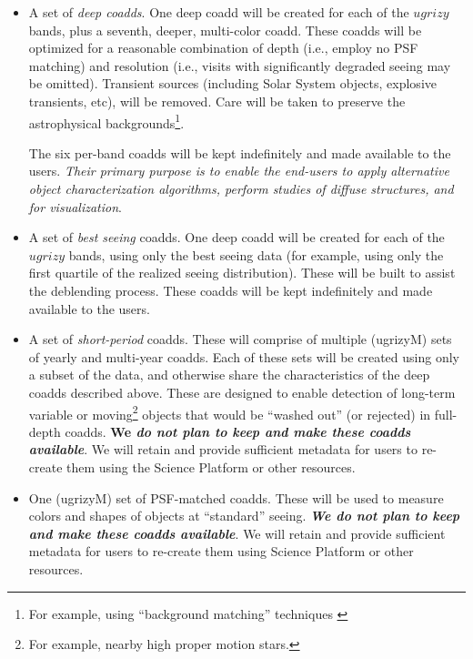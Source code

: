 \documentclass[SE,lsstdraft,toc]{lsstdoc}
\begin{document}
\begin{itemize}
    \item A set of \emph{deep coadds}. One deep coadd will be created for each of the $ugrizy$ bands, plus a seventh, deeper, multi-color coadd. These coadds will be optimized for a reasonable combination of depth (i.e., employ no PSF matching) and resolution (i.e., visits with significantly degraded seeing may be omitted). Transient sources (including Solar System objects, explosive transients, etc), will be removed. Care will be taken to preserve the astrophysical backgrounds\footnote{For example, using ``background matching'' techniques \citep{DMTN-035}}.

    The six per-band coadds will be kept indefinitely and made available to the users. \emph{Their primary purpose is to enable the end-users to apply alternative object characterization algorithms, perform studies of diffuse structures, and for visualization}.

    \item A set of \emph{best seeing} coadds. One deep coadd will be created for each of the $ugrizy$ bands, using only the best seeing data (for example, using only the first quartile of the realized seeing distribution). These will be built to assist the deblending process. These coadds will be kept indefinitely and made available to the users. 

    \item A set of \emph{short-period} coadds. These will comprise of multiple (ugrizyM) sets of yearly and multi-year coadds. Each of these sets will be created using only a subset of the data, and otherwise share the characteristics of the deep coadds described above. These are designed to enable detection of long-term variable or moving\footnote{For example, nearby high proper motion stars.} objects that would be ``washed out'' (or rejected) in full-depth coadds. \textbf{We \em do not plan to keep and make these coadds available}. We will retain and provide sufficient metadata for users to re-create them using  the Science Platform or other resources.

    \item One (ugrizyM) set of PSF-matched coadds. These will be used to measure colors and shapes of objects at ``standard'' seeing. \textbf{\emph{We do not plan to keep and make these coadds available}}. We will retain and provide sufficient metadata for users to re-create them using Science Platform  or other resources.
\end{itemize}
\end{document}
